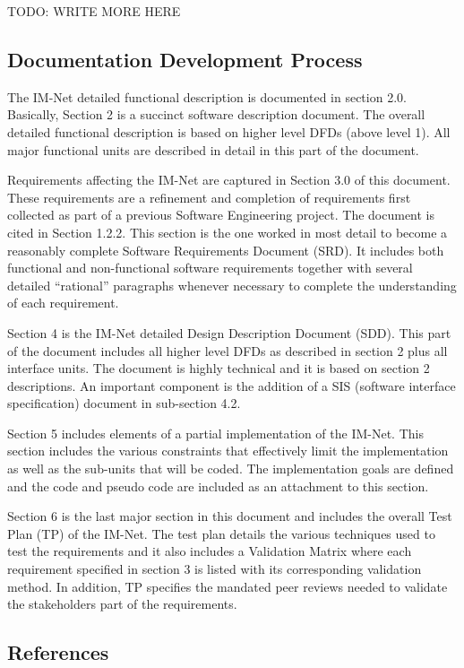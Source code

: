 \documentclass[letterpaper]{article}
\begin{document}
TODO: WRITE MORE HERE

\subsection{\textcolor{subsection}{Documentation Development Process}}

The IM-Net detailed functional description is documented in section 2.0. Basically, Section 2 is a succinct software description document. The overall detailed functional description is based on higher level DFDs (above level 1). All major functional units are described in detail in this part of the document.

Requirements affecting the IM-Net are captured in Section 3.0 of this document.  These requirements are a refinement and completion of requirements first collected as part of a previous Software Engineering project. The document is cited in Section 1.2.2. This section is the one worked in most detail to become a reasonably complete Software Requirements Document (SRD). It includes both functional and non-functional software requirements together with several detailed ``rational'' paragraphs whenever necessary to complete the understanding of each requirement.

Section 4 is the IM-Net detailed Design Description Document (SDD). This part of the document includes all higher level DFDs as described in section 2 plus all interface units. The document is highly technical and it is based on section 2 descriptions. An important component is the addition of a SIS (software interface specification) document in sub-section 4.2.

Section 5 includes elements of a partial implementation of the IM-Net. This section includes the various constraints that effectively limit the implementation as well as the sub-units that will be coded. The implementation goals are defined and the code and pseudo code are included as an attachment to this section.  

Section 6 is the last major section in this document and includes the overall Test Plan (TP) of the IM-Net. The test plan details the various techniques used to test the requirements and it also includes a Validation Matrix where each requirement specified in section 3 is listed with its corresponding validation method. In addition, TP specifies the mandated peer reviews needed to validate the stakeholders part of the requirements.

 
\subsection{\textcolor{subsection}{References}}
\end{document}
